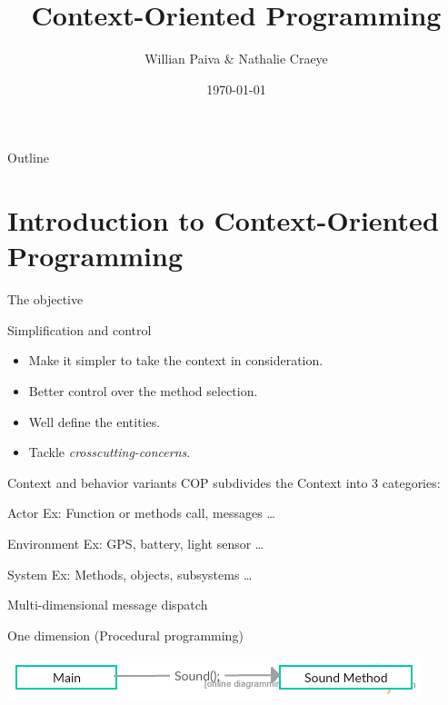 \documentclass[presentation]{beamer}
\author{Willian Paiva \& Nathalie Craeye}
\date{\today}
\title{Context-Oriented Programming}
\begin{document}
\maketitle
\begin{frame}{Outline}
\tableofcontents
\end{frame}


\section{Introduction to Context-Oriented Programming}
\label{sec:org203da34}

\begin{frame}[label={sec:org06c2a92}]{The objective}
\begin{block}{Simplification and control}
\begin{itemize}
\item Make it simpler to take the context in consideration.
\item Better control over the method selection.
\item Well define the entities.
\item Tackle \emph{crosscutting-concerns}.
\end{itemize}
\end{block}
\end{frame}



\begin{frame}[label={sec:org1fee1dc}]{Context and behavior variants}
COP subdivides the Context into 3 categories:
\begin{block}{Actor}
Ex: Function or methods call, messages \ldots{}
\end{block}
\begin{block}{Environment}
Ex: GPS, battery, light sensor \ldots{} 
\end{block}
\begin{block}{System}
Ex: Methods, objects, subsystems \ldots{}
\end{block}
\end{frame}


\begin{frame}[label={sec:orgd6e65b4}]{Multi-dimensional message dispatch}
\begin{block}{One dimension (Procedural programming)}
\begin{center}
\includegraphics[width=.9\linewidth]{./one.jpg}
\end{center}
\end{block}
\end{frame}
\end{document}
